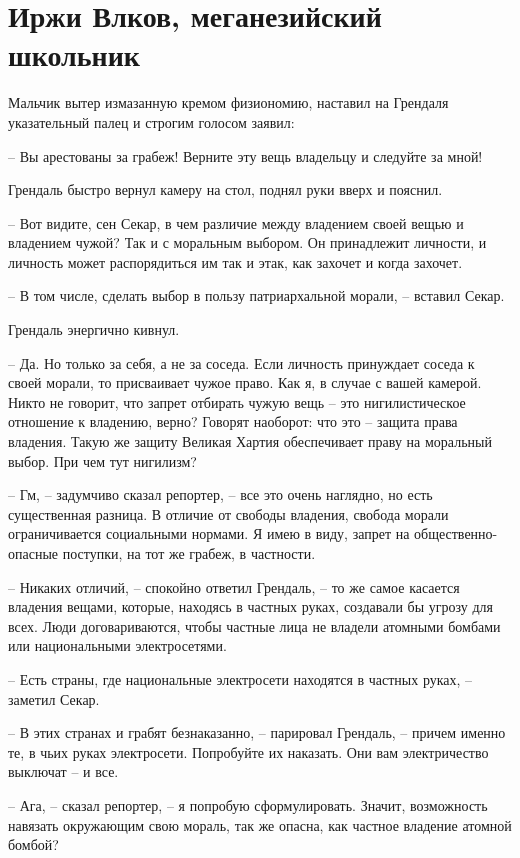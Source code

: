 \chapter{Иржи Влков, меганезийский школьник}


Мальчик вытер измазанную кремом физиономию, наставил на Грендаля указательный палец и строгим голосом заявил:

-- Вы арестованы за грабеж! Верните эту вещь владельцу и следуйте за мной!

Грендаль быстро вернул камеру на стол, поднял руки вверх и пояснил.

-- Вот видите, сен Секар, в чем различие между владением своей вещью и владением чужой? Так и с моральным выбором. Он принадлежит личности, и личность может распорядиться им так и этак, как захочет и когда захочет.

-- В том числе, сделать выбор в пользу патриархальной морали, -- вставил Секар.

Грендаль энергично кивнул.

-- Да. Но только за себя, а не за соседа. Если личность принуждает соседа к своей морали, то присваивает чужое право. Как я, в случае с вашей камерой. Никто не говорит, что запрет отбирать чужую вещь -- это нигилистическое отношение к владению, верно? Говорят наоборот: что это -- защита права владения. Такую же защиту Великая Хартия обеспечивает праву на моральный выбор. При чем тут нигилизм?

-- Гм, -- задумчиво сказал репортер, -- все это очень наглядно, но есть существенная разница. В отличие от свободы владения, свобода морали ограничивается социальными нормами. Я имею в виду, запрет на общественно-опасные поступки, на тот же грабеж, в частности.

-- Никаких отличий, -- спокойно ответил Грендаль, -- то же самое касается владения вещами, которые, находясь в частных руках, создавали бы угрозу для всех. Люди договариваются, чтобы частные лица не владели атомными бомбами или национальными электросетями.

-- Есть страны, где национальные электросети находятся в частных руках, -- заметил Секар.

-- В этих странах и грабят безнаказанно, -- парировал Грендаль, -- причем именно те, в чьих руках электросети. Попробуйте их наказать. Они вам электричество выключат -- и все.

-- Ага, -- сказал репортер, -- я попробую сформулировать. Значит, возможность навязать окружающим свою мораль, так же опасна, как частное владение атомной бомбой?

